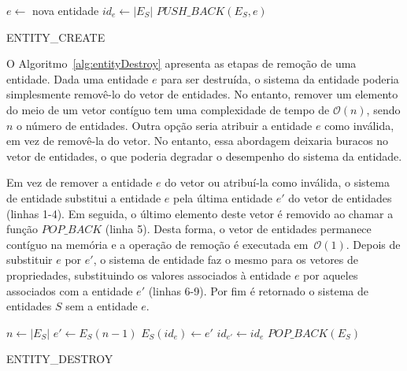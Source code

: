 \begin{algorithm}[ht]
 \LinesNumbered
      $e \gets $ nova entidade\;
      $id_e \gets |E_S|$\;
      $PUSH\_BACK(E_S, e)$\;
      \;
   \caption{ENTITY\_CREATE}
   \label{alg:entityCreate}
 \end{algorithm}

 O Algoritmo~\ref{alg:entityDestroy} apresenta as etapas de remoção de uma entidade. Dada uma entidade $ e $ para ser destruída, o sistema da entidade poderia simplesmente removê-lo do vetor de entidades. No entanto, remover um elemento do meio de um vetor contíguo tem uma complexidade de tempo de $\mathcal{O}(n)$, sendo $ n $ o número de entidades. Outra opção seria atribuir a entidade $ e $ como inválida, em vez de removê-la do vetor. No entanto, essa abordagem deixaria buracos no vetor de entidades, o que poderia degradar o desempenho do sistema da entidade.

  Em vez de remover a entidade $ e $ do vetor ou atribuí-la como inválida, o sistema de entidade substitui a entidade $e$ pela última entidade $e'$ do vetor de entidades (linhas 1-4). Em seguida, o último elemento deste vetor é removido ao chamar a função $ POP\_BACK $ (linha 5). Desta forma, o vetor de entidades permanece contíguo na memória e a operação de remoção é executada em~$\mathcal{O}(1)$. Depois de substituir $ e $ por $ e' $, o sistema de entidade faz o mesmo para os vetores de propriedades, substituindo os valores associados à entidade $ e $ por aqueles associados com a entidade $ e' $ (linhas 6-9). Por fim é retornado o sistema de entidades $S$ sem a entidade $e$.

 \begin{algorithm} [ht]
  \LinesNumbered
         $n \gets |E_S|$\;
         $e' \gets E_S(n-1)$\;
         $E_S(id_e) \gets e'$\;
         $id_{e'} \gets id_e$\;
         $POP\_BACK(E_S)$\;
         \;
    \caption{ENTITY\_DESTROY}
    \label{alg:entityDestroy}
  \end{algorithm}

